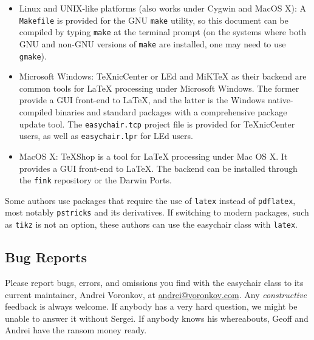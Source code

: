\documentclass{easychair}
\newcommand{\easychair}{\textsf{easychair}}
\newcommand{\miktex}{MiK{\TeX}}
\newcommand{\texniccenter}{{\TeX}nicCenter}
\newcommand{\makefile}{\texttt{Makefile}}
\newcommand{\latexeditor}{LEd}
\begin{document}
\begin{itemize}
\item
Linux and UNIX-like platforms (also works under Cygwin and MacOS X):
A {\makefile} is provided for the GNU \texttt{make} \cite{gmake} utility,
so this document can be compiled by typing \texttt{make} at the terminal 
prompt (on the systems where both GNU and non-GNU versions of \texttt{make} 
are installed, one may need to use \texttt{gmake}).

\item
Microsoft Windows:
{\texniccenter} \cite{texniccenter} or {\latexeditor} \cite{led} and
{\miktex} \cite{miktex} as their backend are common tools
for {\LaTeX} processing under Microsoft Windows. 
The former provide a GUI front-end to {\LaTeX}, and the latter is the 
Windows native-compiled binaries and standard packages with 
a comprehensive package update tool. 
The \texttt{easychair.tcp} project file is provided for {\texniccenter} users,
as well as \texttt{easychair.lpr} for {\latexeditor} users.

\item
MacOS X:
TeXShop \cite{texshop} is a tool for {\LaTeX} processing under Mac OS X.
It provides a GUI front-end to {\LaTeX}. The backend can be installed
through the \texttt{fink} \cite{fink} repository or the Darwin Ports.
\end{itemize}

Some authors use packages that require the use of \texttt{latex}
instead of \texttt{pdflatex}, most notably \texttt{pstricks} and its
derivatives. If switching to modern packages, such as
\texttt{tikz} is not an option, these authors can use the {\easychair}
class with \texttt{latex}. 

\subsection{Bug Reports}
\label{sec:bug-reports}

Please report bugs, errors, and omissions you find with the {\easychair} 
class to its current maintainer, Andrei Voronkov,
at \url{andrei@voronkov.com}. Any \emph{constructive} feedback is
always welcome. If anybody has a very hard question, we might be
unable to answer it without Sergei. If anybody knows his whereabouts,
Geoff and Andrei have the ransom money ready.

\end{document}
